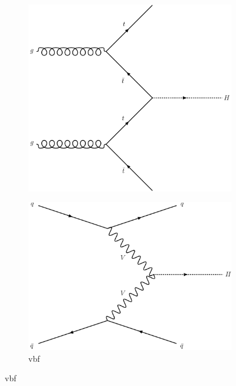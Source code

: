 \begin{figure}[htbp]
    \centering
    \begin{subfigure}[b]{0.45\textwidth}
        \includegraphics[width=\textwidth]{figures/feynman_diagrams/ttH.pdf}
        \caption{\ttH}
    \end{subfigure}
    \hfill
    \begin{subfigure}[b]{0.45\textwidth}
        \includegraphics[width=\textwidth]{figures/feynman_diagrams/VBF.pdf}
        \caption{\acrshort{vbf}}
    \end{subfigure}

\end{figure}
